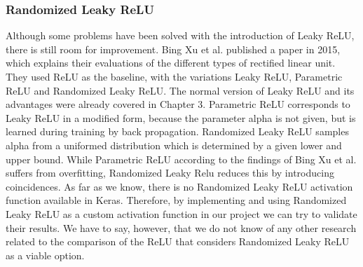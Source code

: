 	\subsubsection{Randomized Leaky ReLU}
	Although some problems have been solved with the introduction of Leaky ReLU, there is still room for improvement. Bing Xu et al. \cite{xu2015empirical} published a paper in 2015, which explains their evaluations of the different types of rectified linear unit. They used ReLU as the baseline, with the variations Leaky ReLU, Parametric ReLU and Randomized Leaky ReLU. The normal version of Leaky ReLU and its advantages were already covered in Chapter 3. Parametric ReLU corresponds to Leaky ReLU in a modified form, because the parameter alpha is not given, but is learned during training by back propagation. Randomized Leaky ReLU samples alpha from a uniformed distribution which is determined by a given lower and upper bound. While Parametric ReLU according to the findings of Bing Xu et al. suffers from overfitting, Randomized Leaky Relu reduces this by introducing coincidences. As far as we know, there is no Randomized Leaky ReLU activation function available in Keras. Therefore, by implementing and using Randomized Leaky ReLU as a custom activation function in our project we can try to validate their results. We have to say, however, that we do not know of any other research related to the comparison of the ReLU that considers Randomized Leaky ReLU as a viable option.
    \\
